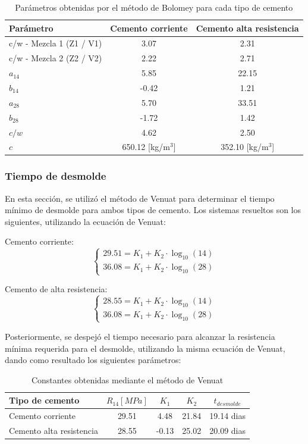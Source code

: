 \begin{table}[H]
\centering
\caption{Parámetros obtenidas por el método de Bolomey para cada tipo de cemento}
\renewcommand{\arraystretch}{1.15}
\small
\begin{tabular}{lcc}
\hline
Parámetro & Cemento corriente & Cemento alta resistencia \\ \hline
c/w - Mezcla 1 (Z1 / V1) & 3.07 & 2.31 \\
c/w - Mezcla 2 (Z2 / V2) & 2.22 & 2.71 \\
$a_{14}$ & 5.85 & 22.15 \\
$b_{14}$ & -0.42 & 1.21 \\
$a_{28}$ & 5.70 & 33.51 \\
$b_{28}$ & -1.72 & 1.42 \\
$c/w$ & 4.62 & 2.50 \\ 
$c$ & 650.12 [kg/m$^3$] & 352.10 [kg/m$^3$] \\ \hline
\end{tabular}
\end{table}

\subsubsection*{Tiempo de desmolde}

En esta sección, se utilizó el método de Venuat para determinar el tiempo mínimo de desmolde para ambos tipos de cemento. Los sistemas resueltos son los siguientes, utilizando la ecuación de Venuat:

Cemento corriente:
\[
\begin{cases}
29.51 = K_1 + K_2 \cdot \log_{10}(14) \\
36.08 = K_1 + K_2 \cdot \log_{10}(28)
\end{cases}
\]

Cemento de alta resistencia:
\[
\begin{cases}
28.55 = K_1 + K_2 \cdot \log_{10}(14) \\
36.08 = K_1 + K_2 \cdot \log_{10}(28)
\end{cases}
\]

Posteriormente, se despejó el tiempo necesario para alcanzar la resistencia mínima requerida para el desmolde, utilizando la misma ecuación de Venuat, dando como resultado los siguientes parámetros:

\begin{table}[H]
\centering
\caption{Constantes obtenidas mediante el método de Venuat}
\renewcommand{\arraystretch}{1.15}
\small
\begin{tabular}{lcccc}
\hline
Tipo de cemento & $R_{14} [MPa]$ & $K_1$ & $K_2$ & $t_{desmolde}$ \\ \hline
Cemento corriente & 29.51 & 4.48 & 21.84 & 19.14 dias \\
Cemento alta resistencia & 28.55 & -0.13 & 25.02 & 20.09 dias\\ \hline
\end{tabular}
\end{table}

